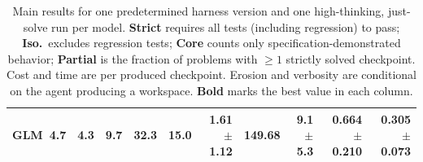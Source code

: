 \begin{table}[t]
\begin{tabular}{l | rrrr | rrr | rr}
\midrule
GLM~4.7 & 4.3 & 9.7 & 32.3 & 15.0 & 1.61{\scriptsize$\pm$1.12} & 149.68 & 9.1{\scriptsize$\pm$5.3} & 0.664{\scriptsize$\pm$0.210} & 0.305{\scriptsize$\pm$0.073} \\
\bottomrule
\end{tabular}
\caption{Main \scb{} results for one predetermined harness version and one high-thinking, just-solve run per model. \textbf{Strict} requires all tests (including regression) to pass; \textbf{Iso.}\ excludes regression tests; \textbf{Core} counts only specification-demonstrated behavior; \textbf{Partial} is the fraction of problems with $\geq 1$ strictly solved checkpoint. Cost and time are per produced checkpoint. Erosion and verbosity are conditional on the agent producing a workspace. \textbf{Bold} marks the best value in each column.}
\label{tab:performance-overview}
\end{table}